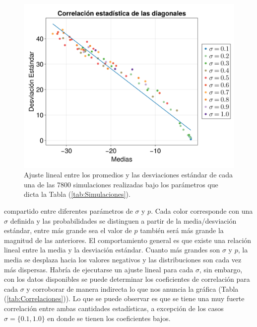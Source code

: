 \begin{figure} \vspace{-20pt} \begin{center}
		\includegraphics[scale=0.15]{../Imagenes/CorrelacionMvsStd}
	\end{center}
	\vspace{-20pt} 
	\caption{Ajuste lineal entre los promedios y las desviaciones estándar de cada una de las 7800 simulaciones realizadas bajo los parámetros que dicta la Tabla (\ref{tab:Simulaciones}).}
	\vspace{-10pt}
	\label{fig:CorrelacionMvsStd}
\end{figure}
compartido entre diferentes parámetros de $\sigma$ y $p$. Cada color corresponde con una $\sigma$ definida y las probabilidades se distinguen a partir de la media/desviación estándar, entre más grande sea el valor de $p$ también será más grande la magnitud de las anteriores. El comportamiento general es que existe una relación lineal entre la media y la desviación estándar. Cuanto más grandes son $\sigma$ y $p$, la media se desplaza hacia los valores negativos y las distribuciones son cada vez más dispersas.
Habría de ejecutarse un ajuste lineal para cada $\sigma$, sin embargo, con los datos disponibles se puede determinar los coeficientes de correlación para cada $\sigma$ y corroborar de manera indirecta lo que nos anuncia la gráfica (Tabla (\ref{tab:Correlaciones})). Lo que se puede observar es que se tiene una muy fuerte correlación entre ambas cantidades estadísticas, a excepción de los casos $\sigma=\{0.1,1.0\}$ en donde se tienen los coeficientes bajos. \\
